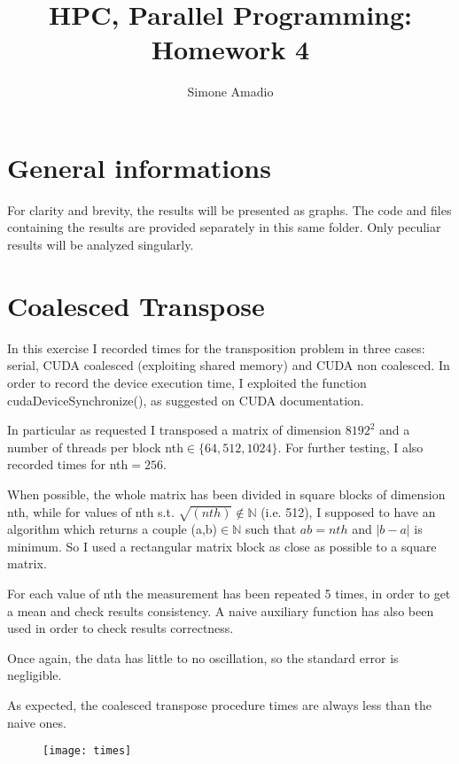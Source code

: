 \documentclass[10pt,a4paper]{article}
\begin{document}
\author{Simone Amadio}
\title{HPC, Parallel Programming:\\Homework 4}
\date{}
\maketitle

\section*{General informations}

For clarity and brevity, the results will be presented as graphs. The code and files containing the results are provided separately in this same folder. Only peculiar results will be analyzed singularly.

\section{Coalesced Transpose}
In this exercise I recorded times for the transposition problem in three cases: serial, CUDA coalesced (exploiting shared memory) and CUDA non coalesced. In order to record the device execution time, I exploited the function cudaDeviceSynchronize(), as suggested on CUDA documentation.

In particular as requested I transposed a matrix of dimension $8192^2$ and a number of threads per block nth$\in \{64,512,1024\}$. For further testing, I also recorded times for nth$=256$.

When possible, the whole matrix has been divided in square blocks of dimension nth, while for values of nth s.t. $\sqrt{(nth)}\notin \mathbb{N}$ (i.e. 512), I supposed to have an algorithm which returns a couple (a,b)$\in\mathbb{N}$ such that $ab=nth$ and $|b-a|$ is minimum. So I used a rectangular matrix block as close as possible to a square matrix.

For each value of nth the measurement has been repeated 5 times, in order to get a mean and check results consistency. A naive auxiliary function has also been used in order to check results correctness.

Once again, the data has little to no oscillation, so the standard error is negligible.

As expected, the coalesced transpose procedure times are always less than the naive ones. 
\newpage
\begin{figure}[h]
	\centering
	\texttt{[image: times]}
	\caption*{}
	\label{fig:times}
\end{figure}
\end{document}
